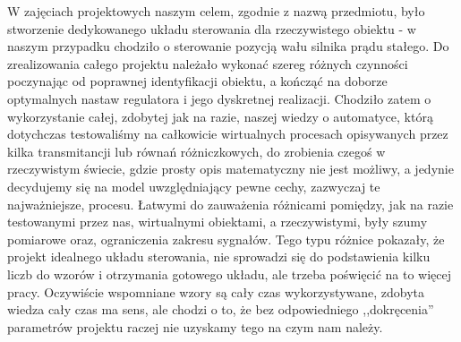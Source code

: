 \documentclass[11 pt]{article}
\begin{document}
W zajęciach projektowych naszym celem, zgodnie z nazwą przedmiotu, było stworzenie dedykowanego układu sterowania dla rzeczywistego obiektu - w naszym przypadku chodziło o sterowanie pozycją wału silnika prądu stałego.
Do zrealizowania całego projektu należało wykonać szereg różnych czynności poczynając od poprawnej identyfikacji obiektu, a kończąć na doborze optymalnych nastaw regulatora i jego dyskretnej realizacji. Chodziło zatem o wykorzystanie całej, zdobytej jak na razie, naszej wiedzy o automatyce, którą dotychczas testowaliśmy na całkowicie wirtualnych procesach opisywanych przez kilka transmitancji lub równań różniczkowych, do zrobienia czegoś w rzeczywistym świecie, gdzie prosty opis matematyczny nie jest możliwy, a jedynie decydujemy się na model uwzględniający pewne cechy, zazwyczaj te najważniejsze, procesu. Łatwymi do zauważenia różnicami pomiędzy, jak na razie testowanymi przez nas, wirtualnymi obiektami, a rzeczywistymi, były szumy pomiarowe oraz, ograniczenia zakresu sygnałów. Tego typu różnice pokazały, że projekt idealnego układu sterowania, nie sprowadzi się do podstawienia kilku liczb do wzorów i otrzymania gotowego układu, ale trzeba poświęcić na to więcej pracy. Oczywiście wspomniane wzory są cały czas wykorzystywane, zdobyta wiedza cały czas ma sens, ale chodzi o to, że bez odpowiedniego ,,dokręcenia'' parametrów projektu raczej nie uzyskamy tego na czym nam należy.
\end{document}
